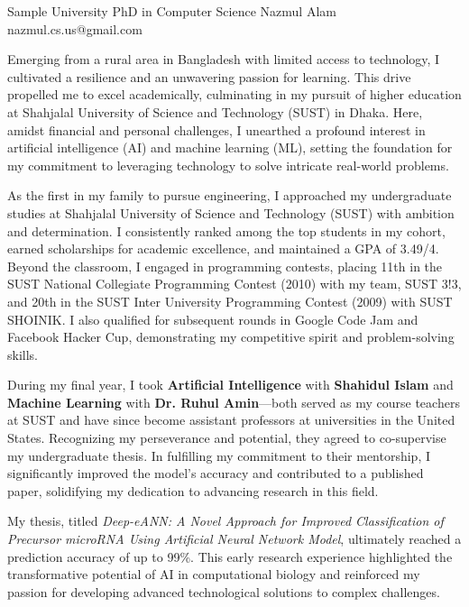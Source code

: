 \documentclass[11pt]{article}
\begin{document}
\showsectionsfalse

\sopHeader
  {Sample University}
  {PhD in Computer Science}
  {Nazmul Alam}
  {nazmul.cs.us@gmail.com}

\ifshowsections{}\fi
\firstparagraph Emerging from a rural area in Bangladesh with limited access to technology, I cultivated a resilience
and an unwavering passion for learning. This drive propelled me to excel academically, culminating
in my pursuit of higher education at Shahjalal University of Science and Technology (SUST) in Dhaka.
Here, amidst financial and personal challenges, I unearthed a profound interest in artificial intelligence
(AI) and machine learning (ML), setting the foundation for my commitment to leveraging technology to solve
intricate real-world problems.

\ifshowsections{}\fi
\firstparagraph As the first in my family to pursue engineering, I approached my undergraduate studies at Shahjalal University
of Science and Technology (SUST) with ambition and determination. I consistently ranked among the top students
in my cohort, earned scholarships for academic excellence, and maintained a GPA of 3.49/4. Beyond the classroom,
I engaged in programming contests, placing 11th in the SUST National Collegiate Programming Contest (2010) with
my team, SUST 3!3, and 20th in the SUST Inter University Programming Contest (2009) with SUST SHOINIK. I also
qualified for subsequent rounds in Google Code Jam and Facebook Hacker Cup, demonstrating my competitive spirit
and problem-solving skills.

During my final year, I took \textbf{Artificial Intelligence} with \textbf{Shahidul Islam} and \textbf{Machine
Learning} with \textbf{Dr. Ruhul Amin}—both served as my course teachers at SUST and have since become assistant
professors at universities in the United States. Recognizing my perseverance and potential, they agreed to
co-supervise my undergraduate thesis. In fulfilling my commitment to their mentorship, I significantly improved
the model’s accuracy and contributed to a published paper, solidifying my dedication to advancing research
in this field.

My thesis, titled \textit{Deep-eANN: A Novel Approach for Improved Classification of Precursor microRNA Using
Artificial Neural Network Model}, ultimately reached a prediction accuracy of up to 99\%. This early research
experience highlighted the transformative potential of AI in computational biology and reinforced my passion for
developing advanced technological solutions to complex challenges.
\end{document}
